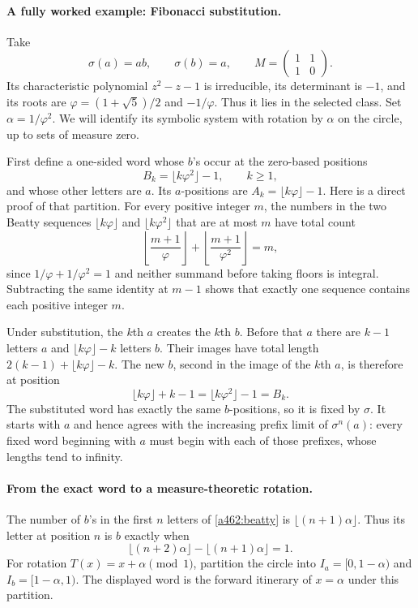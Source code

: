 \documentclass[11pt]{article}
\begin{document}
\paragraph{A fully worked example: Fibonacci substitution.}
Take
\[
 \sigma(a)=ab,\qquad\sigma(b)=a,
 \qquad M=\begin{pmatrix}1&1\\1&0\end{pmatrix}.
\]
Its characteristic polynomial $z^2-z-1$ is irreducible, its determinant
is $-1$, and its roots are $\varphi=(1+\sqrt5)/2$ and $-1/\varphi$.
Thus it lies in the selected class. Set $\alpha=1/\varphi^2$.
We will identify its symbolic system with rotation by $\alpha$ on the
circle, up to sets of measure zero.

First define a one-sided word whose $b$'s occur at the zero-based positions
\begin{equation}\label{a462:beatty}
 B_k=\lfloor k\varphi^2\rfloor-1,\qquad k\ge1,
\end{equation}
and whose other letters are $a$. Its $a$-positions are
$A_k=\lfloor k\varphi\rfloor-1$. Here is a direct proof of that
partition. For every positive integer $m$, the numbers in the two Beatty
sequences $\lfloor k\varphi\rfloor$ and $\lfloor k\varphi^2\rfloor$
that are at most $m$ have total count
\[
 \left\lfloor\frac{m+1}{\varphi}\right\rfloor+
 \left\lfloor\frac{m+1}{\varphi^2}\right\rfloor=m,
\]
since $1/\varphi+1/\varphi^2=1$ and neither summand before taking
floors is integral. Subtracting the same identity at $m-1$ shows that
exactly one sequence contains each positive integer $m$.

Under substitution, the $k$th $a$ creates the $k$th $b$. Before that $a$
there are $k-1$ letters $a$ and $\lfloor k\varphi\rfloor-k$ letters
$b$. Their images have total length
$2(k-1)+\lfloor k\varphi\rfloor-k$. The new $b$, second in the image
of the $k$th $a$, is therefore at position
\[
 \lfloor k\varphi\rfloor+k-1
       =\lfloor k\varphi^2\rfloor-1=B_k.
\]
The substituted word has exactly the same $b$-positions, so it is fixed
by $\sigma$. It starts with $a$ and hence agrees with the increasing
prefix limit of $\sigma^n(a)$: every fixed word beginning with $a$
must begin with each of those prefixes, whose lengths tend to infinity.

\paragraph{From the exact word to a measure-theoretic rotation.}
The number of $b$'s in the first $n$ letters of \eqref{a462:beatty} is
$\lfloor(n+1)\alpha\rfloor$. Thus its letter at position $n$ is $b$
exactly when
\[
 \lfloor(n+2)\alpha\rfloor-\lfloor(n+1)\alpha\rfloor=1.
\]
For rotation $T(x)=x+\alpha\pmod1$, partition the circle into
$I_a=[0,1-\alpha)$ and $I_b=[1-\alpha,1)$. The displayed word is
the forward itinerary of $x=\alpha$ under this partition.
\end{document}
